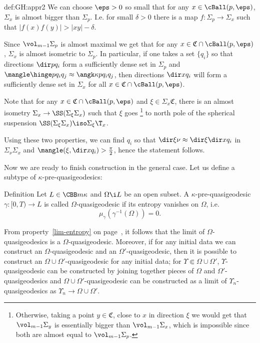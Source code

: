 {\begin{subthm}{def:GH:appr2}
 We can choose $\eps>0$ so small that for any $x\in \cBall(p,\eps)$, 
$\Sigma_x$ is almost bigger than $\Sigma_p$.
I.e. for small $\delta>0$ there is a map $f:\Sigma_p\to \Sigma_x$ such that $|f(x)f(y)|>|x y|-\delta$. 

Since $\vol_{m-1} \Sigma_p$ is almost maximal we get that for any 
$x\in  \mathfrak C\cap \cBall(p,\eps)$, $\Sigma_x$ is almost isometric to $\Sigma_p$.
In particular, if one takes a set $\{q_i\}$ so that directions $\dir p {q_i}$
form a sufficiently dense set in $\Sigma_p$ and 
$\mangle\hinge p{q_i}{q_j}\approx\angk\kappa p{q_i}{q_j}$, 
then directions $\dir x{q_i}$ will form a sufficiently dense set in
$\Sigma_x$ for all $x\in\mathfrak C\cap \cBall(p,\eps)$.

Note that for any $x\in  \mathfrak C\cap \cBall(p,\eps)$ and $\xi\in
\Sigma_x\mathfrak C$,  there is an almost isometry $\Sigma_x\to \SS(\Sigma_\xi \Sigma_x)$ such
that $\xi$ goes%
\footnote{Otherwise, taking a point $y\in \mathfrak C$, close to $x$ in direction
$\xi$ we would get that $\vol_{m-1}\Sigma_y$ is essentially bigger than
$\vol_{m-1}\Sigma_x$, which is impossible since both are almost equal to
$\vol_{m-1}\Sigma_p$.} 
to north pole of the spherical suspension 
$\SS(\Sigma_\xi \Sigma_x)\iso\Sigma_\xi\T_x$.

Using these two properties, we can find $q_i$ so that 
$\dir\xi\nu\approx\dir \xi{\dir x{q_i}}$ in $\Sigma_\nu \Sigma_x$ and
$\mangle(\xi,\dir x{q_i})>\tfrac\pi2$, hence the statement follows.\qeds



Now we are ready to finish construction in the general case. 
Let us define a subtype
of $\kappa$-pre-quasigeodesics:

\begin{thm}{Definition}
Let $L\in \CBB m \kappa$ and $\Omega\i L$ be an open subset. 
A $\kappa$-pre-quasigeodesic $\gamma:[0,T)\to L$ is called $\Omega$-quasigeodesic if  its
entropy vanishes on $\Omega$, i.e. 
$$\mu_\gamma(\gamma^{-1}(\Omega))=0.$$

\end{thm}

From property~\ref{lim-entropy} on page~\pageref{lim-entropy}, it follows that
the limit of $\Omega$-quasigeodesics is a $\Omega$-quasigeodesic. 
Moreover, if for any initial data we can construct an
$\Omega$-quasigeodesic and an $\Omega'$-quasigeodesic, then it is possible to construct an
$\Omega\cup \Omega'$-quasigeodesic for any initial data; for $\Upsilon\Subset\Omega\cup \Omega'$, $\Upsilon$-quasigeodesic can be constructed by joining together
pieces of $\Omega$ and $\Omega'$-quasigeodesics and $\Omega\cup \Omega'$-quasigeodesic can be constructed as a limit of $\Upsilon_n$-quasigeodesics as $\Upsilon_n\to \Omega\cup \Omega'$.


\end{subthm}}
